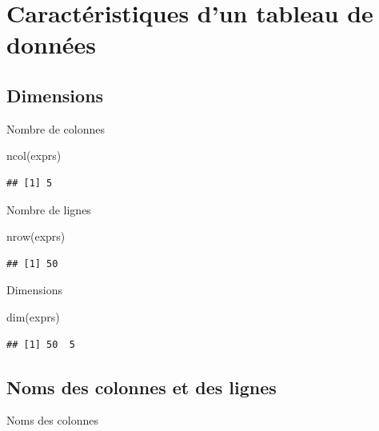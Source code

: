 \documentclass[
]{book}
\newenvironment{Shaded}{\begin{snugshade}}{\end{snugshade}}
\newcommand{\FunctionTok}[1]{\textcolor[rgb]{0.00,0.00,0.00}{#1}}
\newcommand{\NormalTok}[1]{#1}
\begin{document}
\hypertarget{caractuxe9ristiques-dun-tableau-de-donnuxe9es}{%
\section{Caractéristiques d'un tableau de données}\label{caractuxe9ristiques-dun-tableau-de-donnuxe9es}}

\hypertarget{dimensions}{%
\subsection{Dimensions}\label{dimensions}}

Nombre de colonnes

\begin{Shaded}
\begin{Highlighting}[]
\FunctionTok{ncol}\NormalTok{(exprs)}
\end{Highlighting}
\end{Shaded}

\begin{verbatim}
## [1] 5
\end{verbatim}

Nombre de lignes

\begin{Shaded}
\begin{Highlighting}[]
\FunctionTok{nrow}\NormalTok{(exprs) }
\end{Highlighting}
\end{Shaded}

\begin{verbatim}
## [1] 50
\end{verbatim}

Dimensions

\begin{Shaded}
\begin{Highlighting}[]
\FunctionTok{dim}\NormalTok{(exprs)}
\end{Highlighting}
\end{Shaded}

\begin{verbatim}
## [1] 50  5
\end{verbatim}

\hypertarget{noms-des-colonnes-et-des-lignes}{%
\subsection{Noms des colonnes et des lignes}\label{noms-des-colonnes-et-des-lignes}}

Noms des colonnes
\end{document}
